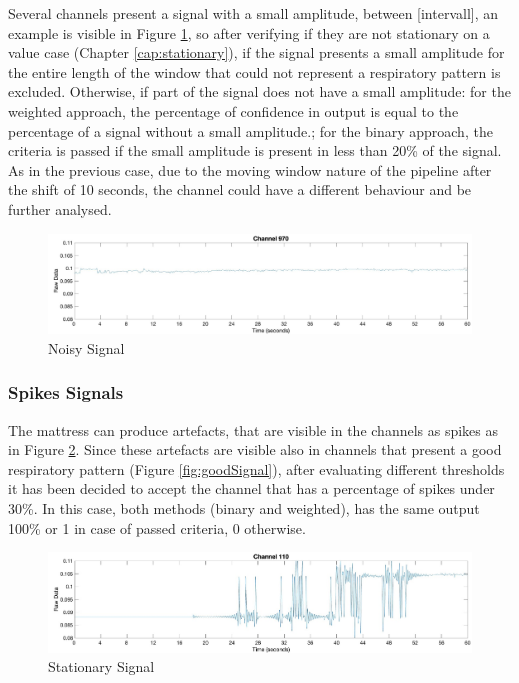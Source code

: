 Several channels present a signal with a small amplitude, between [intervall], an example is visible in Figure \ref{fig:noisy}, so after verifying if they are not stationary on a value case (Chapter \ref{cap:stationary}), if the signal presents a small amplitude for the entire length of the window that could not represent a respiratory pattern is excluded. 
Otherwise, if part of the signal does not have a small amplitude: for the weighted approach, the percentage of confidence in output is equal to the percentage of a signal without a small amplitude.; for the binary approach, the criteria is passed if the small amplitude is present in less than 20\% of the signal.
As in the previous case, due to the moving window nature of the pipeline after the shift of 10 seconds, the channel could have a different behaviour and be further analysed.\\


\begin{figure}[H]
    \centering
    \includegraphics[width=\textwidth]{img/noisy.jpg}
    \caption{Noisy Signal}
    \label{fig:noisy}
\end{figure}


\subsubsection{Spikes Signals} \label{spikes}
The mattress can produce artefacts, that are visible in the channels as spikes as in Figure \ref{fig:spikeTotal}. 
Since these artefacts are visible also in channels that present a good respiratory pattern (Figure \ref{fig:goodSignal}), after evaluating different thresholds it has been decided to accept the channel that has a percentage of spikes under 30\%. In this case, both methods (binary and weighted), has the same output 100\% or 1 in case of passed criteria, 0 otherwise.\\


\begin{figure}[H]
    \centering
    \includegraphics[width=\textwidth]{img/spike_total.jpg}
    \caption{Stationary Signal}
    \label{fig:spikeTotal}
\end{figure}

